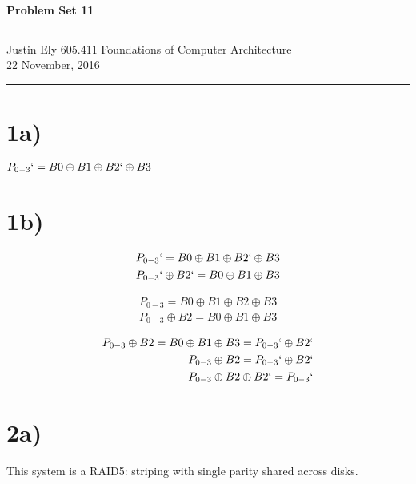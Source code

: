 \documentclass[a4paper,11pt]{article}
\begin{document}
\begin{flushright}

\vspace{1.1cm}

{\bf\Huge Problem Set 11}

\rule{0.25\linewidth}{0.5pt}

\vspace{0.5cm}
Justin Ely
\linebreak
\newline
\footnotesize{605.411 Foundations of Computer Architecture \\}
\vspace{0.5cm}
22 November, 2016
\end{flushright}

\noindent\rule{\linewidth}{1.0pt}


\section*{1a)}
$P_{0-3}` = B0 \oplus B1 \oplus B2` \oplus B3$

\section*{1b)}
\begin{eqnarray}
P_{0-3}` = B0 \oplus B1 \oplus B2` \oplus B3 \\
P_{0-3}` \oplus B2` = B0 \oplus B1 \oplus B3 
\end{eqnarray}

\begin{eqnarray}
P_{0-3} = B0 \oplus B1 \oplus B2  \oplus B3 \\
P_{0-3} \oplus B2 = B0 \oplus B1 \oplus B3 
\end{eqnarray}

\begin{eqnarray}
P_{0-3} \oplus B2 = B0 \oplus B1 \oplus B3  = P_{0-3}` \oplus B2` \\
P_{0-3} \oplus B2  = P_{0-3}` \oplus B2` \\
P_{0-3} \oplus B2 \oplus B2` = P_{0-3}`  
\end{eqnarray}


\section*{2a)} 
This system is a RAID5: striping with single parity shared across disks.
\end{document}
